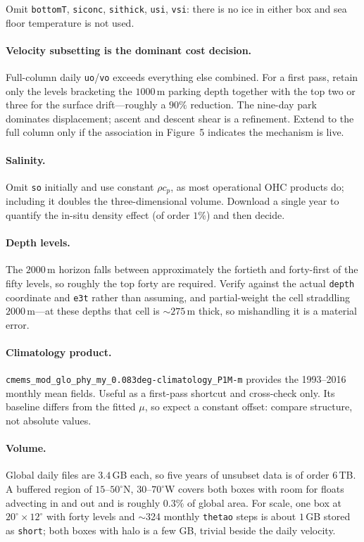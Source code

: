 \documentclass[11pt]{article}
\begin{document}
Omit \texttt{bottomT}, \texttt{siconc}, \texttt{sithick}, \texttt{usi}, \texttt{vsi}: there is
no ice in either box and sea floor temperature is not used.

\paragraph{Velocity subsetting is the dominant cost decision.} Full-column daily
\texttt{uo}/\texttt{vo} exceeds everything else combined. For a first pass, retain only the
levels bracketing the $1000$\,m parking depth together with the top two or three for the
surface drift---roughly a $90\%$ reduction. The nine-day park dominates displacement; ascent
and descent shear is a refinement. Extend to the full column only if the association in
Figure~5 indicates the mechanism is live.

\paragraph{Salinity.} Omit \texttt{so} initially and use constant $\rho c_p$, as most
operational OHC products do; including it doubles the three-dimensional volume. Download a
single year to quantify the in-situ density effect (of order $1\%$) and then decide.

\paragraph{Depth levels.} The $2000$\,m horizon falls between approximately the fortieth and
forty-first of the fifty levels, so roughly the top forty are required. Verify against the
actual \texttt{depth} coordinate and \texttt{e3t} rather than assuming, and partial-weight the
cell straddling $2000$\,m---at these depths that cell is $\sim275$\,m thick, so mishandling it
is a material error.

\paragraph{Climatology product.} \texttt{cmems\_mod\_glo\_phy\_my\_0.083deg-climatology\_P1M-m}
provides the 1993--2016 monthly mean fields. Useful as a first-pass shortcut and cross-check
only. Its baseline differs from the fitted $\mu$, so expect a constant offset: compare
structure, not absolute values.

\paragraph{Volume.} Global daily files are $3.4$\,GB each, so five years of unsubset data is of
order $6$\,TB. A buffered region of $15$--$50^\circ$N, $30$--$70^\circ$W covers both boxes with
room for floats advecting in and out and is roughly $0.3\%$ of global area. For scale, one box
at $20^\circ\times12^\circ$ with forty levels and $\sim$324 monthly \texttt{thetao} steps is
about $1$\,GB stored as \texttt{short}; both boxes with halo is a few GB, trivial beside the
daily velocity.
\end{document}
